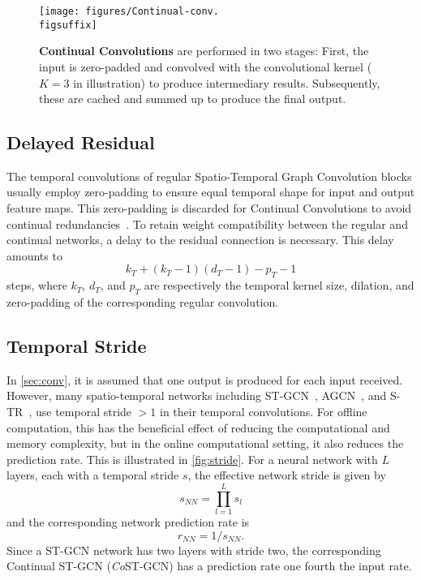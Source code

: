\documentclass[journal]{IEEEtran}
\newcommand{\figsuffix}{png}
\theoremstyle{definition}
\begin{document}
\begin{figure}[ht]
    \centering
    \texttt{[image: figures/Continual-conv.\\figsuffix]}
    \caption{\textbf{Continual Convolutions} are performed in two stages: First, the input is zero-padded and convolved with the convolutional kernel ($K = 3$ in illustration) to produce intermediary results. Subsequently, these are cached and summed up to produce the final output. }
    \label{fig:co-conv}
\end{figure}


\subsection{Delayed Residual}
The temporal convolutions of regular Spatio-Temporal Graph Convolution blocks usually employ zero-padding to ensure equal temporal shape for input and output feature maps.
This zero-padding is discarded for Continual Convolutions to avoid continual redundancies~\cite{hedegaard2021continual}.
To retain weight compatibility between the regular and continual networks, a delay to the residual connection is necessary. This delay amounts to
\begin{equation}
    k_T + (k_T - 1)(d_T-1) - p_T - 1
    \label{eq:delay}
\end{equation}
steps, where $k_T$, $d_T$, and $p_T$ are respectively the temporal kernel size, dilation, and zero-padding of the corresponding regular convolution.


\subsection{Temporal Stride}\label{sec:stride}
In \cref{sec:conv}, it is assumed that one output is produced for each input received.
However, many spatio-temporal networks including ST-GCN~\cite{yan2018spatial}, AGCN~\cite{shi2019two}, and S-TR~\cite{plizzari2021skeleton}, use temporal stride $>1$ in their temporal convolutions.
For offline computation, this has the beneficial effect of reducing the computational and memory complexity, but in the online computational setting, it also reduces the prediction rate. This is illustrated in \cref{fig:stride}.
For a neural network with $L$ layers, each with a temporal stride $s$, the effective network stride is given by
\begin{equation}
    s_{NN} = \prod_{l=1}^{L} s_l
\end{equation}
and the corresponding network prediction rate is
\begin{equation}
    r_{NN} = 1 / s_{NN}.
\end{equation}
Since a ST-GCN network has two layers with stride two, the corresponding Continual ST-GCN (\textit{Co}ST-GCN) has a prediction rate one fourth the input rate.
\end{document}
